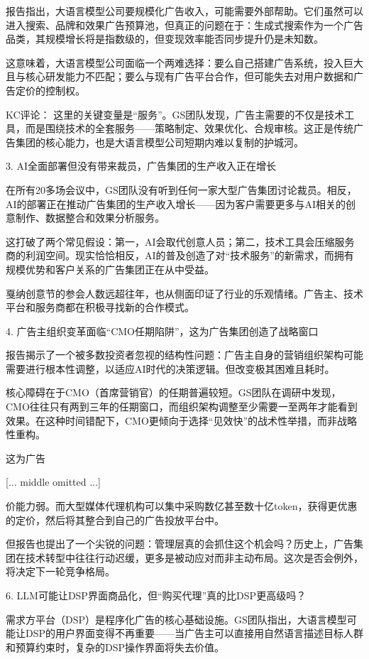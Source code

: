 \documentclass[11pt]{ctexart}
\begin{document}
报告指出，大语言模型公司要规模化广告收入，可能需要外部帮助。它们虽然可以进入搜索、品牌和效果广告预算池，但真正的问题在于：生成式搜索作为一个广告品类，其规模增长将是指数级的，但变现效率能否同步提升仍是未知数。

这意味着，大语言模型公司面临一个两难选择：要么自己搭建广告系统，投入巨大且与核心研发能力不匹配；要么与现有广告平台合作，但可能失去对用户数据和广告定价的控制权。

KC评论： 这里的关键变量是“服务”。GS团队发现，广告主需要的不仅是技术工具，而是围绕技术的全套服务——策略制定、效果优化、合规审核。这正是传统广告集团的核心能力，也是大语言模型公司短期内难以复制的护城河。

3. AI全面部署但没有带来裁员，广告集团的生产收入正在增长

在所有20多场会议中，GS团队没有听到任何一家大型广告集团讨论裁员。相反，AI的部署正在推动广告集团的生产收入增长——因为客户需要更多与AI相关的创意制作、数据整合和效果分析服务。

这打破了两个常见假设：第一，AI会取代创意人员；第二，技术工具会压缩服务商的利润空间。现实恰恰相反，AI的普及创造了对“技术服务”的新需求，而拥有规模优势和客户关系的广告集团正在从中受益。

戛纳创意节的参会人数远超往年，也从侧面印证了行业的乐观情绪。广告主、技术平台和服务商都在积极寻找新的合作模式。

4. 广告主组织变革面临“CMO任期陷阱”，这为广告集团创造了战略窗口

报告揭示了一个被多数投资者忽视的结构性问题：广告主自身的营销组织架构可能需要进行根本性调整，以适应AI时代的决策逻辑。但改变极其困难且耗时。

核心障碍在于CMO（首席营销官）的任期普遍较短。GS团队在调研中发现，CMO往往只有两到三年的任期窗口，而组织架构调整至少需要一至两年才能看到效果。在这种时间错配下，CMO更倾向于选择“见效快”的战术性举措，而非战略性重构。

这为广告

[... middle omitted ...]

价能力弱。而大型媒体代理机构可以集中采购数亿甚至数十亿token，获得更优惠的定价，然后将其整合到自己的广告投放平台中。

但报告也提出了一个尖锐的问题：管理层真的会抓住这个机会吗？历史上，广告集团在技术转型中往往行动迟缓，更多是被动应对而非主动布局。这次是否会例外，将决定下一轮竞争格局。

6. LLM可能让DSP界面商品化，但“购买代理”真的比DSP更高级吗？

需求方平台（DSP）是程序化广告的核心基础设施。GS团队指出，大语言模型可能让DSP的用户界面变得不再重要——当广告主可以直接用自然语言描述目标人群和预算约束时，复杂的DSP操作界面将失去价值。
\end{document}
